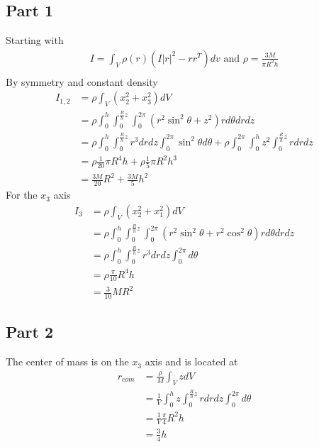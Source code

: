 \subsection{Part 1}
Starting with
\begin{equation}
\begin{split}
    I =\int_V \rho(r)(I |r|^2-rr^T) dv \textrm{ and } \rho = \frac{3M}{\pi R^2 h}\\
\end{split}
\end{equation}
By symmetry and constant density
\begin{equation}
\begin{split}
    I_{1,2} &= \rho \int_V (x_{2}^2+x_3^2)dV\\
    &= \rho \int_0^h \int_0^{\frac{R}{h}z} \int_0^{2\pi} (r^2\sin^2\theta + z^2) r d\theta dr dz\\
    &=\rho \int_0^h \int_0^{\frac{R}{h}z}r^3drdz\int_0^{2\pi}\sin^2\theta d\theta + \rho \int_0^{2\pi} \int_0^h z^2 \int_0^{\frac{R}{h}z}rdrdz\\
    &=\rho \frac{1}{20}\pi R^4 h + \rho\frac{1}{5}\pi R^2 h^3\\
    &= \frac{3M}{20}R^2+\frac{3M}{5}h^2
\end{split}
\end{equation}
For the $x_3$ axis
\begin{equation}
\begin{split}
    I_{3} &= \rho \int_V (x_2^2+x_1^2)dV\\
&= \rho \int_0^h \int_0^{\frac{R}{h}z} \int_0^{2\pi} (r^2\sin^2\theta + r^2\cos^2\theta) r d\theta dr dz\\
&=\rho \int_0^h \int_0^{\frac{R}{h}z}r^3drdz\int_0^{2\pi}d\theta\\
&=\rho \frac{\pi}{10}R^4h\\
&= \frac{3}{10}MR^2
\end{split}
\end{equation}

\subsection{Part 2}
The center of mass is on the $x_3$ axis and is located at
\begin{equation}
\begin{split}
    r_{com} &= \frac{\rho}{M}\int_VzdV\\
    &= \frac{1}{V} \int_0^h z\int_0^{\frac{R}{h}z}rdrdz\int_0^{2\pi}d\theta\\
    &=\frac{1}{V} \frac{\pi}{4}R^2h\\
    &= \frac{3}{4}h
\end{split}
\end{equation}


